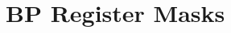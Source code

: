 \hypertarget{group___b_p___register___masks}{}\section{BP Register Masks}
\label{group___b_p___register___masks}
